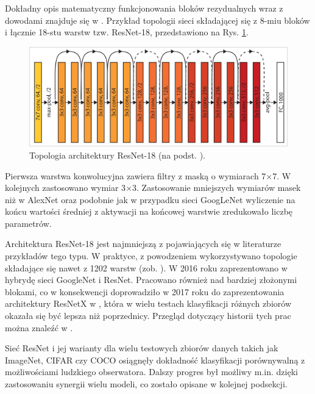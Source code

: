 Dokładny opis matematyczny funkcjonowania bloków rezydualnych wraz z dowodami znajduje się w \cite{DBLP:journals/corr/HeZR016}. Przykład topologii sieci składającej się z 8-miu bloków i łącznie 18-stu warstw tzw. ResNet-18, przedstawiono na Rys. \ref{ResNetTopo}.
\begin{figure}[h!]
	\centering
	\includegraphics[width=1\textwidth]{figures/ResNet.jpg}
	\caption{Topologia architektury ResNet-18 (na podst. \cite{ResNet}).}
	\label{ResNetTopo}
\end{figure} 

Pierwsza warstwa konwolucyjna zawiera filtry z maską o wymiarach 7$\times$7. \linebreak W kolejnych zastosowano wymiar 3$\times$3. Zastosowanie mniejszych wymiarów masek niż w AlexNet oraz podobnie jak w przypadku sieci GoogLeNet wyliczenie na końcu wartości średniej z aktywacji na końcowej warstwie zredukowało liczbę parametrów.

Architektura ResNet-18 jest najmniejszą z pojawiających się w literaturze przykładów tego typu. W praktyce, z powodzeniem wykorzystywano topologie składające się nawet z 1202 warstw (zob. \cite{ResNet}). W 2016 roku zaprezentowano w \cite{InceptionResNet} hybrydę sieci GoogleNet i ResNet. Pracowano również nad bardziej złożonymi blokami, \linebreak co w konsekwencji doprowadziło w 2017 roku do zaprezentowania architektury ResNetX w \cite{ResNetX}, która w wielu testach klasyfikacji różnych zbiorów okazała się być lepsza niż poprzednicy. Przegląd dotyczący historii tych prac można znaleźć w \cite{ResNetXoverview}.

Sieć ResNet i jej warianty dla wielu testowych zbiorów danych takich jak ImageNet, CIFAR czy COCO \cite{COCO} osiągnęły dokładność klasyfikacji porównywalną \linebreak z możliwościami ludzkiego obserwatora. Dalszy progres był możliwy m.in. dzięki zastosowaniu synergii wielu modeli, co zostało opisane w kolejnej podsekcji.

